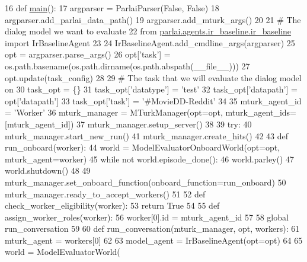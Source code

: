 \begin{DoxyCode}
16 \textcolor{keyword}{def }\hyperlink{namespaceprojects_1_1wizard__of__wikipedia_1_1mturk__evaluation__task_1_1run_ad3ab2c71f8083c3112815c0b363d316b}{main}():
17     argparser = ParlaiParser(\textcolor{keyword}{False}, \textcolor{keyword}{False})
18     argparser.add\_parlai\_data\_path()
19     argparser.add\_mturk\_args()
20 
21     \textcolor{comment}{# The dialog model we want to evaluate}
22     \textcolor{keyword}{from} \hyperlink{namespaceparlai_1_1agents_1_1ir__baseline_1_1ir__baseline}{parlai.agents.ir\_baseline.ir\_baseline} \textcolor{keyword}{import} IrBaselineAgent
23 
24     IrBaselineAgent.add\_cmdline\_args(argparser)
25     opt = argparser.parse\_args()
26     opt[\textcolor{stringliteral}{'task'}] = os.path.basename(os.path.dirname(os.path.abspath(\_\_file\_\_)))
27     opt.update(task\_config)
28 
29     \textcolor{comment}{# The task that we will evaluate the dialog model on}
30     task\_opt = \{\}
31     task\_opt[\textcolor{stringliteral}{'datatype'}] = \textcolor{stringliteral}{'test'}
32     task\_opt[\textcolor{stringliteral}{'datapath'}] = opt[\textcolor{stringliteral}{'datapath'}]
33     task\_opt[\textcolor{stringliteral}{'task'}] = \textcolor{stringliteral}{'#MovieDD-Reddit'}
34 
35     mturk\_agent\_id = \textcolor{stringliteral}{'Worker'}
36     mturk\_manager = MTurkManager(opt=opt, mturk\_agent\_ids=[mturk\_agent\_id])
37     mturk\_manager.setup\_server()
38 
39     \textcolor{keywordflow}{try}:
40         mturk\_manager.start\_new\_run()
41         mturk\_manager.create\_hits()
42 
43         \textcolor{keyword}{def }run\_onboard(worker):
44             world = ModelEvaluatorOnboardWorld(opt=opt, mturk\_agent=worker)
45             \textcolor{keywordflow}{while} \textcolor{keywordflow}{not} world.episode\_done():
46                 world.parley()
47             world.shutdown()
48 
49         mturk\_manager.set\_onboard\_function(onboard\_function=run\_onboard)
50         mturk\_manager.ready\_to\_accept\_workers()
51 
52         \textcolor{keyword}{def }check\_worker\_eligibility(worker):
53             \textcolor{keywordflow}{return} \textcolor{keyword}{True}
54 
55         \textcolor{keyword}{def }assign\_worker\_roles(worker):
56             worker[0].id = mturk\_agent\_id
57 
58         \textcolor{keyword}{global} run\_conversation
59 
60         \textcolor{keyword}{def }run\_conversation(mturk\_manager, opt, workers):
61             mturk\_agent = workers[0]
62 
63             model\_agent = IrBaselineAgent(opt=opt)
64 
65             world = ModelEvaluatorWorld(

\end{DoxyCode}
